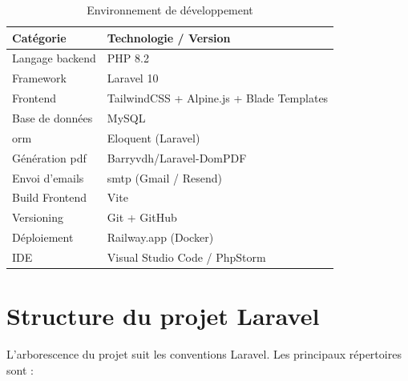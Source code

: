 \documentclass[a4paper,12pt,twoside]{report}
\begin{document}
\begin{table}[!h]
    \renewcommand{\tablename}{Tableau}
    \centering
    \caption{Environnement de développement}
    \label{tab:outils}
    \smallskip
    \begin{tabular}{|p{4cm}|p{9cm}|}
        \hline
        \textbf{Catégorie} & \textbf{Technologie / Version} \\
        \hline \hline
        Langage backend & PHP 8.2 \\
        \hline
        Framework & Laravel 10 \\
        \hline
        Frontend & TailwindCSS + Alpine.js + Blade Templates \\
        \hline
        Base de données & MySQL \\
        \hline
        \gls{orm} & Eloquent (Laravel) \\
        \hline
        Génération \gls{pdf} & Barryvdh/Laravel-DomPDF \\
        \hline
        Envoi d'emails & \gls{smtp} (Gmail / Resend) \\
        \hline
        Build Frontend & Vite \\
        \hline
        Versioning & Git + GitHub \\
        \hline
        Déploiement & Railway.app (Docker) \\
        \hline
        IDE & Visual Studio Code / PhpStorm \\
        \hline
    \end{tabular}
\end{table}

\section{Structure du projet Laravel}

L'arborescence du projet suit les conventions Laravel. Les principaux répertoires sont :
\end{document}
